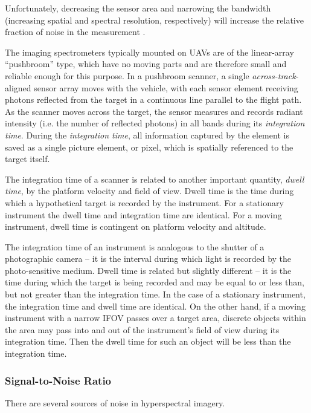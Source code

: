 Unfortunately, decreasing the sensor area and narrowing the bandwidth (increasing spatial and spectral resolution, respectively) will increase the relative fraction of noise in the measurement \cite{Moses2012, Wolfe2997}.

The imaging spectrometers typically mounted on UAVs are of the linear-array ``pushbroom'' type, which have no moving parts and are therefore small and reliable enough for this purpose. In a pushbroom scanner, a single \emph{across-track}-aligned sensor array moves with the vehicle, with each sensor element receiving photons reflected from the target in a continuous line parallel to the flight path. As the scanner moves across the target, the sensor measures and records radiant intensity (i.e. the number of reflected photons) in all bands during its \emph{integration time}. During the \emph{integration time}, all information captured by the element is saved as a single picture element, or pixel, which is spatially referenced to the target itself. 

The integration time of a scanner is related to another important quantity, \emph{dwell time}, by the platform velocity and field of view. Dwell time is the time during which a hypothetical target is recorded by the instrument. For a stationary instrument the dwell time and integration time are identical. For a moving instrument, dwell time is contingent on platform velocity and altitude.

The integration time of an instrument is analogous to the shutter of a photographic camera -- it is the interval during which light is recorded by the photo-sensitive medium. Dwell time is related but slightly different -- it is the time during which the target is being recorded and may be equal to or less than, but not greater than the integration time. In the case of a stationary instrument, the integration time and dwell time are identical. On the other hand, if a moving instrument with a narrow IFOV passes over a target area, discrete objects within the area may pass into and out of the instrument's field of view during its integration time. Then the dwell time for such an object will be less than the integration time.


\subsubsection{Signal-to-Noise Ratio}

There are several sources of noise in hyperspectral imagery. 

